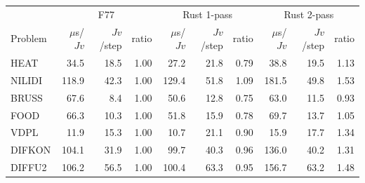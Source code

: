 \begin{tabular}{lrrrrrrrrr}
\toprule
& \multicolumn{3}{c}{F77} & \multicolumn{3}{c}{Rust 1-pass} & \multicolumn{3}{c}{Rust 2-pass} \\
Problem & $\mu$s/$Jv$ & $Jv$/step & ratio & $\mu$s/$Jv$ & $Jv$/step & ratio & $\mu$s/$Jv$ & $Jv$/step & ratio \\
\midrule
HEAT & 34.5 & 18.5 & 1.00 & 27.2 & 21.8 & 0.79 & 38.8 & 19.5 & 1.13 \\
NILIDI & 118.9 & 42.3 & 1.00 & 129.4 & 51.8 & 1.09 & 181.5 & 49.8 & 1.53 \\
BRUSS & 67.6 & 8.4 & 1.00 & 50.6 & 12.8 & 0.75 & 63.0 & 11.5 & 0.93 \\
FOOD & 66.3 & 10.3 & 1.00 & 51.8 & 15.9 & 0.78 & 69.7 & 13.7 & 1.05 \\
VDPL & 11.9 & 15.3 & 1.00 & 10.7 & 21.1 & 0.90 & 15.9 & 17.7 & 1.34 \\
DIFKON & 104.1 & 31.9 & 1.00 & 99.7 & 40.3 & 0.96 & 136.0 & 40.2 & 1.31 \\
DIFFU2 & 106.2 & 56.5 & 1.00 & 100.4 & 63.3 & 0.95 & 156.7 & 63.2 & 1.48 \\
\bottomrule
\end{tabular}

